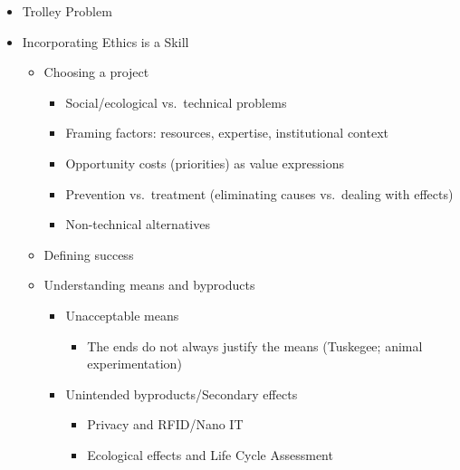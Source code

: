 \begin{itemize}
  \item Trolley Problem

  \item Incorporating Ethics is a Skill

    \begin{itemize}

    \item Choosing a project

        \begin{itemize}

          \item Social/ecological vs.\ technical problems

          \item Framing factors: resources, expertise, institutional context

          \item Opportunity costs (priorities) as value expressions

          \item Prevention vs.\ treatment (eliminating causes vs.\ dealing with effects)

          \item Non-technical alternatives

        \end{itemize}

    \item Defining success

    \item Understanding means and byproducts

      \begin{itemize}

        \item Unacceptable means

          \begin{itemize}

            \item The ends do not always justify the means (Tuskegee; animal experimentation)

          \end{itemize}

        \item Unintended byproducts/Secondary effects

          \begin{itemize}

            \item Privacy and RFID/Nano IT

            \item Ecological effects and Life Cycle Assessment


\end{itemize}
\end{itemize}
\end{itemize}
\end{itemize}
